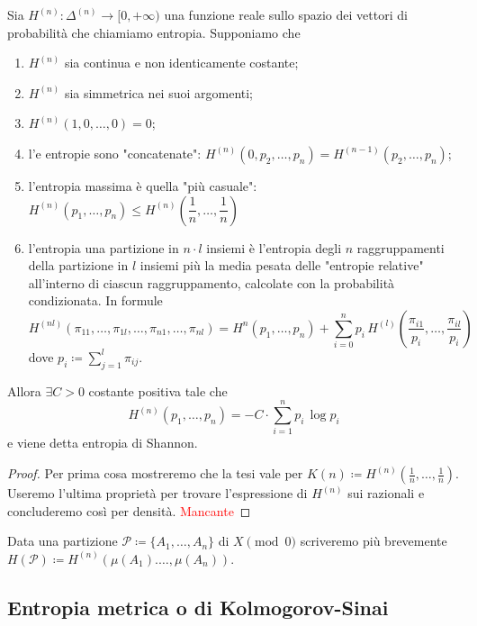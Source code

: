 \begin{thm}
    Sia $ H^{(n)} \colon \Delta^{(n)} \to [0, +\infty) $ una funzione reale sullo spazio dei vettori di probabilità che chiamiamo entropia. Supponiamo che
    \begin{enumerate}[label=(\roman*)]
        \item $ H^{(n)} $ sia continua e non identicamente costante;
        \item $ H^{(n)} $ sia simmetrica nei suoi argomenti;
        \item $ H^{(n)}(1, 0, \ldots, 0) = 0 $;
        \item l'e entropie sono "concatenate": $ H^{(n)}(0, p_2, \ldots, p_n) = H^{(n-1)}(p_2, \ldots, p_n) $;
        \item l'entropia massima è quella "più casuale": $ H^{(n)}(p_1, \ldots, p_n) \leq H^{(n)}\left(\dfrac{1}{n}, \ldots, \dfrac{1}{n}\right) $
        \item l'entropia una partizione in $ n \cdot l $ insiemi è l'entropia degli $ n $ raggruppamenti della partizione in $ l $ insiemi più la media pesata delle "entropie relative" all'interno di ciascun raggruppamento, calcolate con la probabilità condizionata. In formule
        \[
            H^{(nl)}(\pi_{11}, \ldots, \pi_{1l}, \ldots, \pi_{n1}, \ldots, \pi_{nl}) = H^{n}(p_1, \ldots, p_n) + \sum_{i = 0}^{n} p_i \, H^{(l)} \left(\dfrac{\pi_{i1}}{p_i}, \ldots, \dfrac{\pi_{il}}{p_i}\right)
        \]
        dove $ p_i \coloneqq \sum_{j = 1}^{l} \pi_{ij} $.
    \end{enumerate}
    Allora $ \exists C > 0 $ costante positiva tale che
    \[
        H^{(n)}(p_1, \ldots, p_n) = -C \cdot \sum_{i = 1}^{n} p_i \, \log{p_i}
    \]
    e viene detta entropia di Shannon.
\end{thm}
\begin{proof}
    Per prima cosa mostreremo che la tesi vale per $ K(n) \coloneqq H^{(n)}\left(\frac{1}{n}, \ldots, \frac{1}{n}\right) $. Useremo l'ultima proprietà per trovare l'espressione di $ H^{(n)} $ sui razionali e concluderemo così per densità. \textcolor{red}{Mancante}
\end{proof}

Data una partizione $ \mathcal{P} \coloneqq \{A_1, \ldots, A_n\} $ di $ X \pmod{0} $ scriveremo più brevemente $ H(\mathcal{P}) \coloneqq H^{(n)}(\mu(A_1). \ldots, \mu(A_n)) $.

\subsection{Entropia metrica o di Kolmogorov-Sinai}

